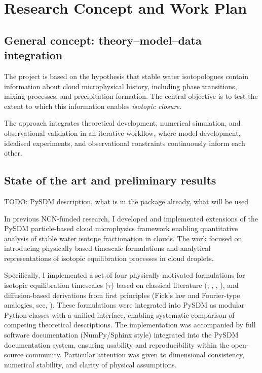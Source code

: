 \documentclass[12pt]{article}
\begin{document}
\section{Research Concept and Work Plan}
\subsection{General concept: theory–model–data integration}
The project is based on the hypothesis that stable water isotopologues contain
information about cloud microphysical history, including phase transitions,
mixing processes, and precipitation formation.
The central objective is to test the extent to which this information enables \emph{isotopic closure}.

The approach integrates theoretical development, numerical simulation,
and observational validation in an iterative workflow, where model development,
idealised experiments, and observational constraints continuously inform each other.

\subsection{State of the art and preliminary results}
    {\color{red}TODO:} PySDM description, what is in the package already, what will be used
    \cite{2023_DeJong_EtAl}

In previous NCN-funded research, I developed and implemented extensions of the PySDM particle-based cloud microphysics
framework enabling quantitative analysis of stable water isotope fractionation in clouds.
The work focused on introducing physically based timescale formulations and analytical representations
of isotopic equilibration processes in cloud droplets.

Specifically, I implemented a set of four physically motivated formulations for isotopic equilibration timescales
($\tau$) based on classical literature (\cite{1958_Bolin}, \cite{1968_Miyake_EtAl}, \cite{1975_Jouzel_EtAl}, \cite{1975_Stewart}),
and diffusion-based derivations from first principles (Fick’s law and Fourier-type analogies, see, \cite{1951_Mason}).
These formulations were integrated into PySDM as modular Python classes with a unified interface,
enabling systematic comparison of competing theoretical descriptions.
The implementation was accompanied by full software documentation (NumPy/Sphinx style) integrated
into the PySDM documentation system, ensuring usability and reproducibility within the open-source community.
Particular attention was given to dimensional consistency, numerical stability, and clarity of physical assumptions.
\end{document}
